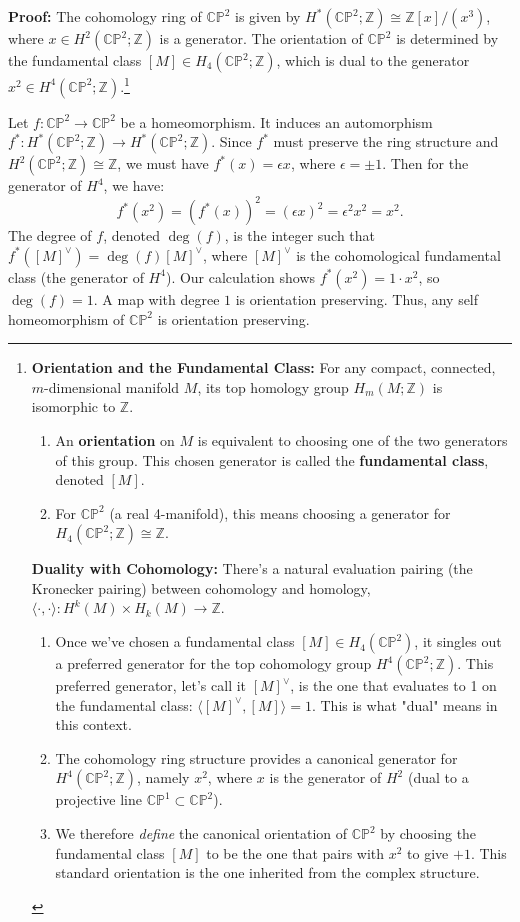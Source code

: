\begin{solution}
\textbf{Proof:} The cohomology ring of $\mathbb{CP}^2$ is given by $H^*(\mathbb{CP}^2; \mathbb{Z}) \cong \mathbb{Z}[x] / (x^3)$, where $x \in H^2(\mathbb{CP}^2; \mathbb{Z})$ is a generator. The orientation of $\mathbb{CP}^2$ is determined by the fundamental class $[M] \in H_4(\mathbb{CP}^2; \mathbb{Z})$, which is dual to the generator $x^2 \in H^4(\mathbb{CP}^2; \mathbb{Z})$.\footnote{
\textbf{Orientation and the Fundamental Class:}
For any compact, connected, $m$-dimensional manifold $M$, its top homology group $H_m(M; \mathbb{Z})$ is isomorphic to $\mathbb{Z}$.
\begin{enumerate}
    \item An \textbf{orientation} on $M$ is equivalent to choosing one of the two generators of this group. This chosen generator is called the \textbf{fundamental class}, denoted $[M]$.
    \item For $\mathbb{CP}^2$ (a real 4-manifold), this means choosing a generator for $H_4(\mathbb{CP}^2; \mathbb{Z}) \cong \mathbb{Z}$.
\end{enumerate}
\textbf{Duality with Cohomology:}
There's a natural evaluation pairing (the Kronecker pairing) between cohomology and homology, $\langle \cdot, \cdot \rangle: H^k(M) \times H_k(M) \to \mathbb{Z}$.
\begin{enumerate}
    \item Once we've chosen a fundamental class $[M] \in H_4(\mathbb{CP}^2)$, it singles out a preferred generator for the top cohomology group $H^4(\mathbb{CP}^2; \mathbb{Z})$. This preferred generator, let's call it $[M]^\vee$, is the one that evaluates to 1 on the fundamental class: $\langle [M]^\vee, [M] \rangle = 1$. This is what "dual" means in this context.
    \item The cohomology ring structure provides a canonical generator for $H^4(\mathbb{CP}^2; \mathbb{Z})$, namely $x^2$, where $x$ is the generator of $H^2$ (dual to a projective line $\mathbb{CP}^1 \subset \mathbb{CP}^2$).
    \item We therefore \textit{define} the canonical orientation of $\mathbb{CP}^2$ by choosing the fundamental class $[M]$ to be the one that pairs with $x^2$ to give $+1$. This standard orientation is the one inherited from the complex structure.
\end{enumerate}
}

Let $f: \mathbb{CP}^2 \to \mathbb{CP}^2$ be a homeomorphism. It induces an automorphism $f^*: H^*(\mathbb{CP}^2; \mathbb{Z}) \to H^*(\mathbb{CP}^2; \mathbb{Z})$. Since $f^*$ must preserve the ring structure and $H^2(\mathbb{CP}^2; \mathbb{Z}) \cong \mathbb{Z}$, we must have $f^*(x) = \epsilon x$, where $\epsilon = \pm 1$.
Then for the generator of $H^4$, we have:
\[ f^*(x^2) = (f^*(x))^2 = (\epsilon x)^2 = \epsilon^2 x^2 = x^2. \]
The degree of $f$, denoted $\deg(f)$, is the integer such that $f^*([M]^\vee) = \deg(f) [M]^\vee$, where $[M]^\vee$ is the cohomological fundamental class (the generator of $H^4$). Our calculation shows $f^*(x^2) = 1 \cdot x^2$, so $\deg(f) = 1$. A map with degree $1$ is orientation preserving. Thus, any self homeomorphism of $\mathbb{CP}^2$ is orientation preserving.
\end{solution}
